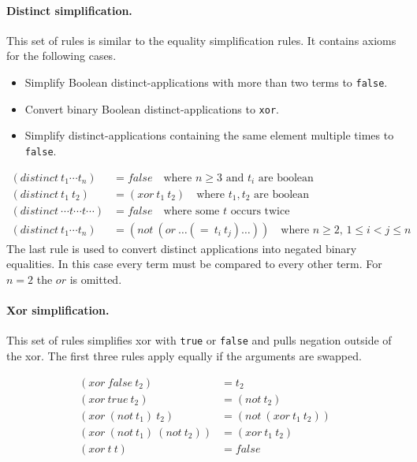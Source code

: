 \documentclass[a4paper]{article}
\begin{document}
\paragraph{Distinct simplification.}
This set of rules is similar to the equality simplification rules.  It
contains axioms for the following cases.
\begin{itemize}
\item Simplify Boolean distinct-applications with more than two terms to
  \verb+false+.
\item Convert binary Boolean distinct-applications to \verb+xor+.
\item Simplify distinct-applications containing the same element multiple
  times to \verb+false+.
\end{itemize}

\begin{align}
  (distinct\ t_1 \cdots t_n) &= false
  \quad \text{where $n \geq 3$ and $t_i$ are boolean}
  \tag{distinctBool}\\
  (distinct\ t_1\ t_2) &= (xor\ t_1\ t_2)
  \quad \text{where $t_1,t_2$ are boolean}
  \tag{distinctToXor}\\
  (distinct\ \cdots t \cdots t \cdots) &= false
  \quad \text{where some $t$ occurs twice}
  \tag{distinctSame}\\
  (distinct\ t_1 \cdots t_n) &= (not\ (or\ \dots (=\ t_i\ t_j)\dots))
  \quad\text{where $n \geq 2$, $1 \leq i < j \leq n$}
  \tag{distinctBinary}
\end{align}
The last rule is used to convert distinct applications into negated
binary equalities.  In this case every term must be compared to every
other term.  For $n=2$ the $or$ is omitted.

\paragraph{Xor simplification.}
This set of rules simplifies xor with \verb+true+ or \verb+false+ and
pulls negation outside of the xor.  The first three rules apply
equally if the arguments are swapped.

\begin{align}
  (xor\ false\ t_2) &= t_2
  \tag{xorFalse}\\
  (xor\ true\ t_2) &= (not\ t_2)
  \tag{xorTrue}\\
  (xor\ (not\ t_1)\ t_2) &= (not\ (xor\ t_1\ t_2))
  \tag{xorNot}\\
  (xor\ (not\ t_1)\ (not\ t_2)) &= (xor\ t_1\ t_2)
  \tag{xorNot}\\
  (xor\ t\ t) &= false
  \tag{xorSame}
\end{align}
\end{document}
